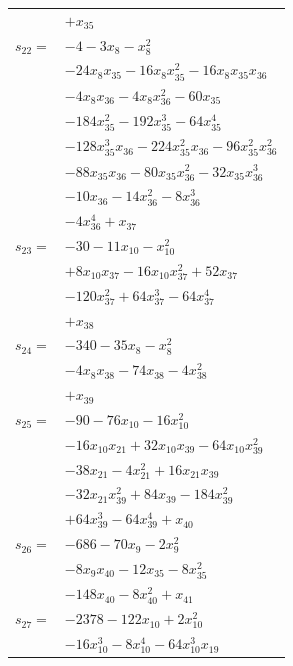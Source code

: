 \begin{longtable}{@{}r@{\;}l@{}}
 & \(\displaystyle +x_{35}\) \\[3pt]
\(s_{22}=\) & \(\displaystyle -4 -3x_{8} -x_{8}^{2}\) \\
 & \(\displaystyle -24x_{8}x_{35} -16x_{8}x_{35}^{2} -16x_{8}x_{35}x_{36}\) \\
 & \(\displaystyle -4x_{8}x_{36} -4x_{8}x_{36}^{2} -60x_{35}\) \\
 & \(\displaystyle -184x_{35}^{2} -192x_{35}^{3} -64x_{35}^{4}\) \\
 & \(\displaystyle -128x_{35}^{3}x_{36} -224x_{35}^{2}x_{36} -96x_{35}^{2}x_{36}^{2}\) \\
 & \(\displaystyle -88x_{35}x_{36} -80x_{35}x_{36}^{2} -32x_{35}x_{36}^{3}\) \\
 & \(\displaystyle -10x_{36} -14x_{36}^{2} -8x_{36}^{3}\) \\
 & \(\displaystyle -4x_{36}^{4} +x_{37}\) \\[3pt]
\(s_{23}=\) & \(\displaystyle -30 -11x_{10} -x_{10}^{2}\) \\
 & \(\displaystyle +8x_{10}x_{37} -16x_{10}x_{37}^{2} +52x_{37}\) \\
 & \(\displaystyle -120x_{37}^{2} +64x_{37}^{3} -64x_{37}^{4}\) \\
 & \(\displaystyle +x_{38}\) \\[3pt]
\(s_{24}=\) & \(\displaystyle -340 -35x_{8} -x_{8}^{2}\) \\
 & \(\displaystyle -4x_{8}x_{38} -74x_{38} -4x_{38}^{2}\) \\
 & \(\displaystyle +x_{39}\) \\[3pt]
\(s_{25}=\) & \(\displaystyle -90 -76x_{10} -16x_{10}^{2}\) \\
 & \(\displaystyle -16x_{10}x_{21} +32x_{10}x_{39} -64x_{10}x_{39}^{2}\) \\
 & \(\displaystyle -38x_{21} -4x_{21}^{2} +16x_{21}x_{39}\) \\
 & \(\displaystyle -32x_{21}x_{39}^{2} +84x_{39} -184x_{39}^{2}\) \\
 & \(\displaystyle +64x_{39}^{3} -64x_{39}^{4} +x_{40}\) \\[3pt]
\(s_{26}=\) & \(\displaystyle -686 -70x_{9} -2x_{9}^{2}\) \\
 & \(\displaystyle -8x_{9}x_{40} -12x_{35} -8x_{35}^{2}\) \\
 & \(\displaystyle -148x_{40} -8x_{40}^{2} +x_{41}\) \\[3pt]
\(s_{27}=\) & \(\displaystyle -2378 -122x_{10} +2x_{10}^{2}\) \\
 & \(\displaystyle -16x_{10}^{3} -8x_{10}^{4} -64x_{10}^{3}x_{19}\) \\

\end{longtable}
